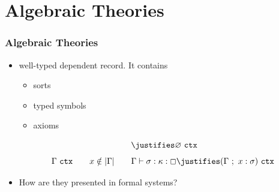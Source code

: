 \documentclass[t,12pt,numbers,fleqn,usenames,xcolor=dvipsnames]{beamer}
\begin{document}

\section{Algebraic Theories}
\begin{frame}[fragile]
\frametitle{Algebraic Theories}
\begin{itemize}
\item well-typed dependent record. It contains	
	   \begin{itemize}
	   	\item sorts
	   	\item typed symbols
	   	\item axioms 
	   \end{itemize}
\begin{figure}[ht]
	\begin{proofrules}
		\[ \ \justifies \varnothing \ \wfctx \]
		\[ \Gamma\ \wfctx \qquad x\notin |\Gamma| 
		\qquad \Gamma \vdash \sigma : \kappa : \Box \justifies
		(\Gamma\ ;\ x : \sigma)\ \wfctx \]
	\end{proofrules}
	\label{fig:ctx}
\end{figure}   
   \pause
   \item How are they presented in formal systems?
\end{itemize}
\end{frame}

\end{document}
